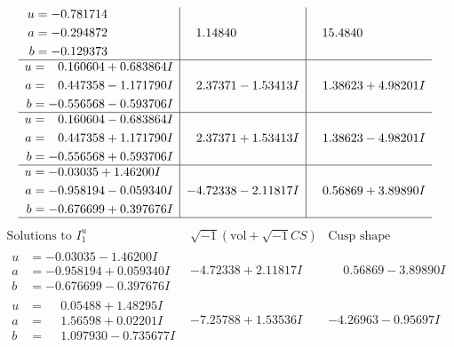 \documentclass[1p]{elsarticle_modified}
\theoremstyle{definition}
\newcommand{\I}{\sqrt{-1}}
\begin{document}
$$\begin{array}{c|c|c}
\begin{aligned}
u &= -0.781714\phantom{ +0.000000I} \\
a &= -0.294872\phantom{ +0.000000I} \\
b &= -0.129373\phantom{ +0.000000I}\end{aligned}
 & \phantom{-}1.14840\phantom{ +0.000000I} & \phantom{-}15.4840\phantom{ +0.000000I} \\ \hline\begin{aligned}
u &= \phantom{-}0.160604 + 0.683864 I \\
a &= \phantom{-}0.447358 - 1.171790 I \\
b &= -0.556568 - 0.593706 I\end{aligned}
 & \phantom{-}2.37371 - 1.53413 I & \phantom{-}1.38623 + 4.98201 I \\ \hline\begin{aligned}
u &= \phantom{-}0.160604 - 0.683864 I \\
a &= \phantom{-}0.447358 + 1.171790 I \\
b &= -0.556568 + 0.593706 I\end{aligned}
 & \phantom{-}2.37371 + 1.53413 I & \phantom{-}1.38623 - 4.98201 I \\ \hline\begin{aligned}
u &= -0.03035 + 1.46200 I \\
a &= -0.958194 - 0.059340 I \\
b &= -0.676699 + 0.397676 I\end{aligned}
 & -4.72338 - 2.11817 I & \phantom{-}0.56869 + 3.89890 I\\
 \hline 
 \end{array}$$\newpage$$\begin{array}{c|c|c}  
\text{Solutions to }I^u_{1}& \I (\text{vol} + \sqrt{-1}CS) & \text{Cusp shape}\\
 \hline 
\begin{aligned}
u &= -0.03035 - 1.46200 I \\
a &= -0.958194 + 0.059340 I \\
b &= -0.676699 - 0.397676 I\end{aligned}
 & -4.72338 + 2.11817 I & \phantom{-}0.56869 - 3.89890 I \\ \hline\begin{aligned}
u &= \phantom{-}0.05488 + 1.48295 I \\
a &= \phantom{-}1.56598 + 0.02201 I \\
b &= \phantom{-}1.097930 - 0.735677 I\end{aligned}
 & -7.25788 + 1.53536 I & -4.26963 - 0.95697 I \\ \hline\begin{aligned}

\end{aligned}
\end{array}$$
\end{document}
